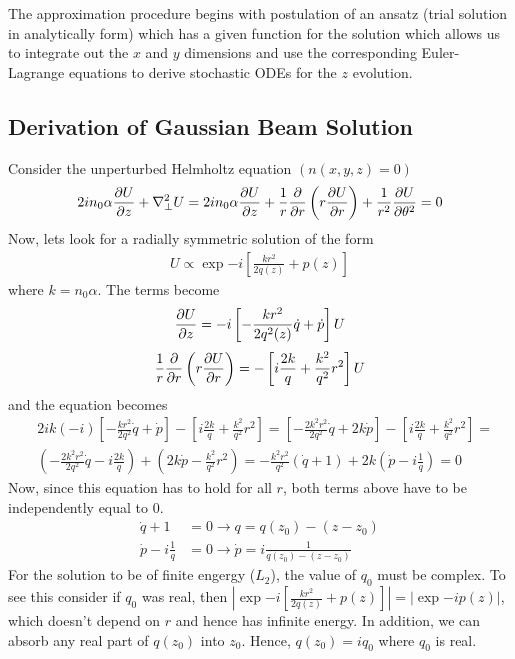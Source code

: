 The approximation procedure begins with postulation of an ansatz (trial solution in  analytically form) which has a given function for the solution which allows us to integrate out the $x$ and $y$ dimensions and use the corresponding Euler-Lagrange equations to derive stochastic ODEs for the $z$ evolution.


\subsection{Derivation of Gaussian Beam Solution}
Consider the unperturbed Helmholtz equation $(n(x,y,z) = 0)$
\begin{equation}
   2i n_0 \alpha \frac{\partial U}{\partial z}  + \nabla_{\perp}^2 U  = 2i n_0 \alpha \frac{\partial U}{\partial z}  + \frac{1}{r}\frac{\partial }{\partial r}\left(r\frac{\partial U}{\partial r}\right) + \frac{1}{r^2}\frac{\partial U}{\partial \theta^2} = 0 
\end{equation}
Now, lets look for a radially symmetric solution of the form 
\begin{equation}
\begin{split}
   U  \propto \exp{-i\left[ \frac{k r^2}{2 q(z)} + p(z) \right]}
\end{split}
\end{equation}
where $k=n_0 \alpha $.  The terms become
\begin{equation}
   \frac{\partial U}{\partial z} =  -i\left[-\frac{k r^2}{2 q^2(z)} \dot{q} + \dot{p}\right] U 
\end{equation}
\begin{equation}
   \frac{1}{r}\frac{\partial }{\partial r}\left(r\frac{\partial U}{\partial r}\right) =  -\left[i \frac{2k}{q} + \frac{k^2}{q^2} r^2\right] U 
\end{equation}
and the equation becomes 
\begin{equation}
   \begin{split}
       &2i k (-i) \left[-\frac{k r^2}{2 q^2} \dot{q} + \dot{p}\right] - \left[i \frac{2k}{q} + \frac{k^2}{q^2} r^2\right]   = \left[-\frac{2k^2 r^2}{2 q^2} \dot{q} + 2k\dot{p}\right] - \left[i \frac{2k}{q} + \frac{k^2}{q^2} r^2\right]  = \\
       &\left(-\frac{2k^2 r^2}{2 q^2} \dot{q} - i \frac{2k}{q}\right) + \left(2k\dot{p} -  \frac{k^2}{q^2} r^2\right) = -\frac{k^2 r^2}{q^2} \left(\dot{q} + 1\right) + 2k\left(\dot{p}- i \frac{1}{q}\right) = 0
   \end{split}
\end{equation}
Now, since this equation has to hold for all $r$, both terms above have to be independently equal to $0$.   
\begin{equation}
   \begin{split}
       \dot{q} + 1 &= 0 \rightarrow q = q(z_0) - (z-z_0)\\
       \dot{p}- i \frac{1}{q} &= 0 \rightarrow \dot{p} =  i \frac{1}{q(z_0) - (z-z_0)}
   \end{split}
\end{equation}
For the solution to be of finite engergy ($L_2$), the value of $q_0$ must be complex.  To see this consider if $q_0$ was real, then $|\exp{-i\left[ \frac{k r^2}{2 q(z)} + p(z) \right]}| = |\exp{-i p(z)}|$, which doesn't depend on $r$ and hence has infinite energy.  In addition, we can absorb any real part of $q(z_0)$ into $z_0$.  Hence, $q(z_0) = iq_0$ where $q_0$ is real.

